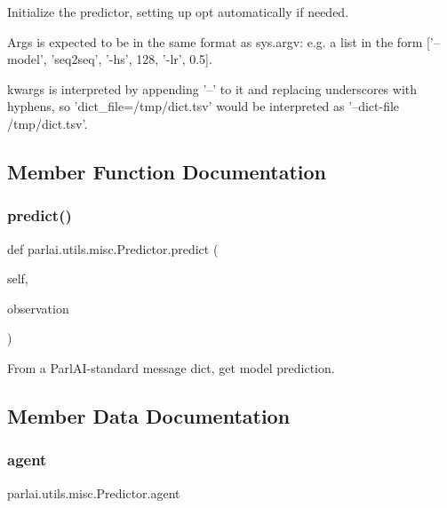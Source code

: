 \begin{DoxyVerb}Initialize the predictor, setting up opt automatically if needed.

Args is expected to be in the same format as sys.argv: e.g. a list in
the form ['--model', 'seq2seq', '-hs', 128, '-lr', 0.5].

kwargs is interpreted by appending '--' to it and replacing underscores
with hyphens, so 'dict_file=/tmp/dict.tsv' would be interpreted as
'--dict-file /tmp/dict.tsv'.
\end{DoxyVerb}
 

\subsection{Member Function Documentation}
\mbox{\label{classparlai_1_1utils_1_1misc_1_1Predictor_a7ff8a927bca43d09d3113dad20cb2a11}} 
\subsubsection{\texorpdfstring{predict()}{predict()}}
{\footnotesize\ttfamily def parlai.\+utils.\+misc.\+Predictor.\+predict (\begin{DoxyParamCaption}\item[{}]{self,  }\item[{}]{observation }\end{DoxyParamCaption})}

\begin{DoxyVerb}From a ParlAI-standard message dict, get model prediction.
\end{DoxyVerb}
 

\subsection{Member Data Documentation}
\mbox{\label{classparlai_1_1utils_1_1misc_1_1Predictor_a0ea35fd562c6edaa6affd03006f1bd08}} 
\subsubsection{\texorpdfstring{agent}{agent}}
{\footnotesize\ttfamily parlai.\+utils.\+misc.\+Predictor.\+agent}

